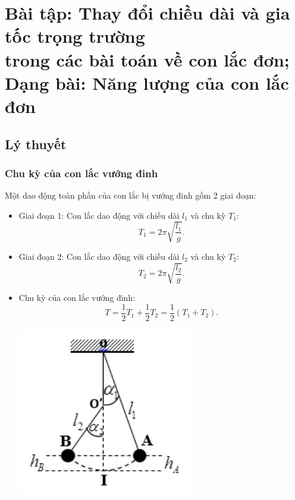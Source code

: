 
\chapter[Bài tập: Thay đổi chiều dài và gia tốc trọng trường trong các bài toán về con lắc đơn;\\Dạng bài: Năng lượng của con lắc đơn]{Bài tập: Thay đổi chiều dài và gia tốc trọng trường\\ trong các bài toán về con lắc đơn;\\Dạng bài: Năng lượng của con lắc đơn}
\section{Lý thuyết}
\subsection{Chu kỳ của con lắc vướng đinh}
Một dao động toàn phần của con lắc bị vướng đinh gồm 2 giai đoạn:
\begin{itemize}
	\item Giai đoạn 1: Con lắc dao động với chiều dài $l_1$ và chu kỳ $T_1$:
	\begin{equation*}
		T_1=2\pi \sqrt{\dfrac{l_1}{g}}.
	\end{equation*} 
	\item Giai đoạn 2: Con lắc dao động với chiều dài $l_2$ và chu kỳ $T_2$:
	\begin{equation*}
		T_2=2\pi \sqrt{\dfrac{l_2}{g}}.
	\end{equation*}  
	\item Chu kỳ của con lắc vướng đinh:
	\begin{equation*}
		T=\dfrac{1}{2}T_1 +\dfrac{1}{2}T_2 = \dfrac{1}{2} (T_1 + T_2).
	\end{equation*}
	\begin{center}
		\includegraphics{../figs/VN12-PH-04-A-003-4-V2-1.JPG}
	\end{center}
\end{itemize}
